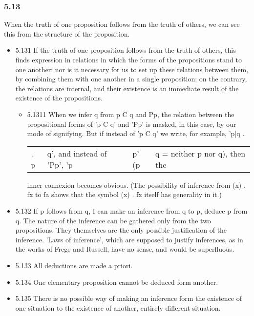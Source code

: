 \documentclass[11pt]{article}
\begin{document}
\subsubsection*{5.13}
\label{sec:orge58b87b}
When the truth of one proposition follows from the truth of others, we
can see this from the structure of the proposition.
\begin{itemize}
\item 5.131
\label{sec:org7b0a711}
If the truth of one proposition follows from the truth of others,
this finds expression in relations in which the forms of the propositions
stand to one another: nor is it necessary for us to set up these relations
between them, by combining them with one another in a single proposition;
on the contrary, the relations are internal, and their existence is an
immediate result of the existence of the propositions.
\begin{itemize}
\item 5.1311
\label{sec:orgf3fb296}
When we infer q from p C q and Pp, the relation between the
propositional forms of 'p C q' and 'Pp' is masked, in this case, by our
mode of signifying. But if instead of 'p C q' we write, for example, 'p|q .
\begin{center}
\begin{tabular}{llll}
. p & q', and instead of 'Pp', 'p & p' (p & q = neither p nor q), then the\\
\end{tabular}
\end{center}
inner connexion becomes obvious. (The possibility of inference from (x) .
fx to fa shows that the symbol (x) . fx itself has generality in it.)
\end{itemize}
\item 5.132
\label{sec:orgd5494aa}
If p follows from q, I can make an inference from q to p, deduce p
from q. The nature of the inference can be gathered only from the two
propositions. They themselves are the only possible justification of the
inference. 'Laws of inference', which are supposed to justify inferences,
as in the works of Frege and Russell, have no sense, and would be
superfluous.
\item 5.133
\label{sec:org516bfaf}
All deductions are made a priori.
\item 5.134
\label{sec:orgf348749}
One elementary proposition cannot be deduced form another.
\item 5.135
\label{sec:orgb8cd1bd}
There is no possible way of making an inference form the existence of
one situation to the existence of another, entirely different situation.

\end{itemize}
\end{document}
